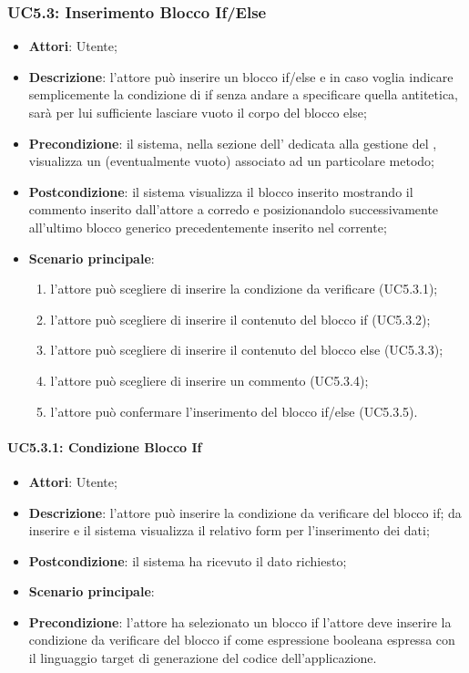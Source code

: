 \subsubsection{UC5.3: Inserimento Blocco If/Else}
\label{UC5.3}
\begin{itemize}
\item \textbf{Attori}: Utente;
\item \textbf{Descrizione}: l'attore può inserire un blocco if/else e in caso voglia indicare semplicemente la condizione di if senza andare a specificare quella antitetica, sarà per lui sufficiente lasciare vuoto il corpo del blocco else;	
\item \textbf{Precondizione}: il sistema, nella sezione dell' dedicata alla gestione del , visualizza un  (eventualmente vuoto) associato ad un particolare metodo;	
\item \textbf{Postcondizione}: il sistema visualizza il blocco inserito mostrando il commento inserito dall'attore a corredo e posizionandolo successivamente all'ultimo blocco generico precedentemente inserito nel  corrente;	
\item \textbf{Scenario principale}:
\begin{enumerate}
\item l'attore può scegliere di inserire la condizione da verificare (UC5.3.1);
\item l'attore può scegliere di inserire il contenuto del blocco if (UC5.3.2);
\item l'attore può scegliere di inserire il contenuto del blocco else (UC5.3.3);
\item l'attore può scegliere di inserire un commento (UC5.3.4);
\item l'attore può confermare l'inserimento del blocco if/else (UC5.3.5).
\end{enumerate}
\end{itemize}

\paragraph{UC5.3.1: Condizione Blocco If}
\label{UC5.3.1}
\begin{itemize}
\item \textbf{Attori}: Utente;
\item \textbf{Descrizione}: l'attore può inserire la condizione da verificare del blocco if;	da inserire e il sistema visualizza il relativo form per l'inserimento dei dati; 
\item \textbf{Postcondizione}: il sistema ha ricevuto il dato richiesto;	
\item \textbf{Scenario principale}:
\item \textbf{Precondizione}: l'attore ha selezionato un blocco if 
l'attore deve inserire la condizione da verificare del blocco if come espressione booleana espressa con il linguaggio target di generazione del codice dell'applicazione.
\end{itemize}

